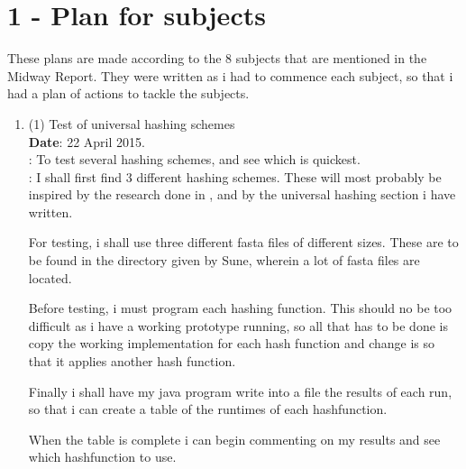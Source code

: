 \documentclass[../../main.tex]{subfiles}
\begin{document}
\section*{1 - Plan for subjects}
These plans are made according to the 8 subjects that are mentioned in the Midway Report. They were written as i had to commence each subject, so that i had a plan of actions to tackle the subjects.
\begin{enumerate}
\item (1) Test of universal hashing schemes\\
{\bf Date}: 22 April 2015.\\
: To test several hashing schemes, and see which is quickest.\\
: I shall first find 3 different hashing schemes. These will most probably be inspired by the research done in \cite{thorupEven}, and by the universal hashing section i have written.

For testing, i shall use three different fasta files of different sizes. These are to be found in the directory given by Sune, wherein a lot of fasta files are located. 

Before testing, i must program each hashing function. This should no be too difficult as i have a working prototype running, so all that has to be done is copy the working implementation for each hash function and change is so that it applies another hash function. 

Finally i shall have my java program write into a file the results of each run, so that i can create a table of the runtimes of each hashfunction. 

When the table is complete i can begin commenting on my results and see which hashfunction to use.
\end{enumerate}
\end{document}
